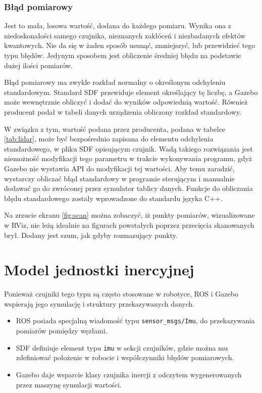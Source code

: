 		\subsubsection{Błąd pomiarowy}
			Jest to mała, losowa wartość, dodana do każdego pomiaru.
			Wynika ona z niedoskonałości samego czujnika, nieznanych zakłóceń i niezbadanych efektów kwantowych.
			Nie da się w żaden sposób usunąć, zmniejszyć, lub przewidzieć tego typu błędów.
			Jedynym sposobem jest obliczenie średniej błędu na podstawie dużej ilości pomiarów.

			Błąd pomiarowy ma zwykle rozkład normalny o określonym odchyleniu standardowym.
			Standard SDF przewiduje element określający tę liczbę, a Gazebo może wewnętrznie obliczyć i dodać do wyników odpowiednią wartość.
			Również producent podał w tabeli danych urządzenia obliczony rozkład standardowy.

			W związku z tym, wartość podana przez producenta, podana w tabelce \ref{tab:lidar}, może być bezpośrednio zapisana do 
			elementu odchylenia standardowego, w pliku SDF opisującym czujnik.
			Wadą takiego rozwiązania jest niemożność modyfikacji tego parametru w trakcie wykonywania programu, gdyż Gazebo nie wystawia API do modyfikacji tej wartości.
			Aby temu zaradzić, wystarczy obliczać błąd standardowy w programie sterującym i manualnie dodawać go do zwróconej przez symulator tablicy danych.
			Funkcje do obliczania błędu standardowego zostały wprowadzone do standardu języka C++.
			
			Na zrzucie ekranu \ref{fig:scan} można zobaczyć, iż punkty pomiarów, wizualizowane w RViz, nie leżą idealnie na figurach powstałych poprzez przecięcia skanowanych brył.
			Dodany jest szum, jak gdyby rozmazujący punkty.
		
\section{Model jednostki inercyjnej}
	Ponieważ czujniki tego typu są często stosowane w robotyce, ROS i Gazebo wspierają jego symulację i struktury przekazywanych danych.
	\begin{itemize}
		\item ROS posiada specjalną wiadomość typu \texttt{sensor\_msgs/Imu}, do przekazywania pomiarów pomiędzy węzłami.
		\item SDF definiuje element typu \texttt{imu} w sekcji czujników, gdzie można mu zdefiniować położenie w robocie i współczynniki błędów pomiarowych.
		\item Gazebo daje wsparcie klasy czujnika inercji z odczytem wygenerowanych przez maszynę symulacji wartości.
	\end{itemize}
	

